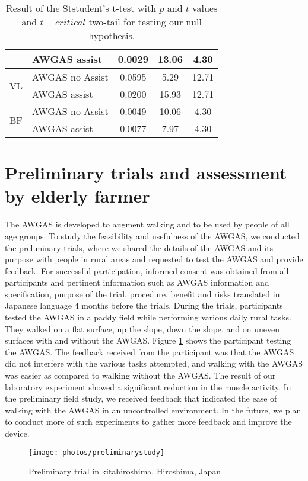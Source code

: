 \documentclass[paper,JRM,paper]{jaciiiarticle}
\begin{document}
\begin{table}[h]
{\begin{tabular}{@{}llccc@{}}
		& AWGAS assist                   & 0.0029  & 13.06   & 4.30                                                           \\ \midrule
		\multirow{2}{*}{VL}  & AWGAS no Assist                & 0.0595  & 5.29    & 12.71                                                          \\ 
		& AWGAS assist                   & 0.0200  & 15.93   & 12.71                                                          \\ \midrule
		\multirow{2}{*}{BF}  & AWGAS no Assist                & 0.0049  & 10.06   & 4.30                                                           \\ 
		& AWGAS assist                   & 0.0077  & 7.97    & 4.30                                                           \\ \bottomrule
	\end{tabular}
	}
	\caption{Result of the Ststudent's t-test with $p$ and $t$ values and $t-critical$ two-tail for testing our null hypothesis.}
	\label{ttestresult}
\end{table}

\section{Preliminary trials and assessment by elderly farmer}


The AWGAS is developed to augment walking and to be used by people of all age groups. To study the feasibility and usefulness of the AWGAS, we conducted the preliminary trials, where we shared the details of the AWGAS and its purpose with people in rural areas and requested to test the AWGAS and provide feedback. For successful participation, informed consent was obtained from all participants and pertinent information such as AWGAS information and specification, purpose of the trial, procedure, benefit and risks translated in Japanese language 4 months before the trials. During the trials, participants tested the AWGAS in a paddy field while performing various daily rural tasks. They walked on a flat surface, up the slope, down the slope, and on uneven surfaces with and without the AWGAS. Figure \ref{fig:preliminarystudy} shows the participant testing the AWGAS. The feedback received from the participant was that the AWGAS did not interfere with the various tasks attempted, and walking with the AWGAS was easier as compared to walking without the AWGAS. The result of our laboratory experiment showed a significant reduction in the muscle activity. In the preliminary field study, we received feedback that indicated the ease of walking with the AWGAS in an uncontrolled environment. In the future, we plan to conduct more of such experiments to gather more feedback and improve the device. 
\begin{figure}[h]
	\centering
	\texttt{[image: photos/preliminarystudy]}
	\caption{Preliminary trial in kitahiroshima, Hiroshima, Japan}
	\label{fig:preliminarystudy}
\end{figure}
\end{document}
